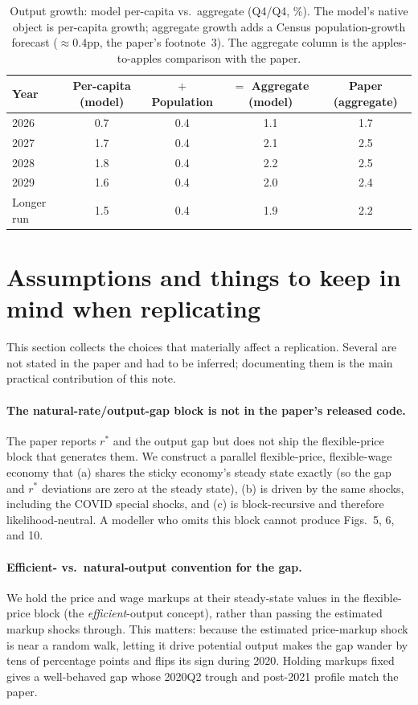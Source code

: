 \documentclass[11pt]{article}
\theoremstyle{definition}
\newcommand{\rstar}{r^{*}}
\begin{document}
\begin{table}[H]
\centering
\caption{Output growth: model per-capita vs.\ aggregate (Q4/Q4, \%). The model's native object is
per-capita growth; aggregate growth adds a Census population-growth forecast ($\approx 0.4$pp, the
paper's footnote~3). The aggregate column is the apples-to-apples comparison with the paper.}
\label{tab:growth-decomp}
\begin{tabular}{lcccc}
\toprule
Year & Per-capita (model) & $+$ Population & $=$ Aggregate (model) & Paper (aggregate) \\
\midrule
2026        & 0.7 & 0.4 & 1.1 & 1.7 \\
2027        & 1.7 & 0.4 & 2.1 & 2.5 \\
2028        & 1.8 & 0.4 & 2.2 & 2.5 \\
2029        & 1.6 & 0.4 & 2.0 & 2.4 \\
Longer run  & 1.5 & 0.4 & 1.9 & 2.2 \\
\bottomrule
\end{tabular}
\end{table}

\section{Assumptions and things to keep in mind when replicating}\label{sec:assumptions}
This section collects the choices that materially affect a replication. Several are not stated in the
paper and had to be inferred; documenting them is the main practical contribution of this note.

\paragraph{The natural-rate/output-gap block is not in the paper's released code.}
The paper reports $\rstar$ and the output gap but does not ship the flexible-price block that generates
them. We construct a parallel flexible-price, flexible-wage economy that (a) shares the sticky economy's
steady state exactly (so the gap and $\rstar$ deviations are zero at the steady state), (b) is driven by
the same shocks, including the COVID special shocks, and (c) is block-recursive and therefore
likelihood-neutral. A modeller who omits this block cannot produce Figs.\ 5, 6, and 10.

\paragraph{Efficient- vs.\ natural-output convention for the gap.}
We hold the price and wage markups at their steady-state values in the flexible-price block (the
\emph{efficient}-output concept), rather than passing the estimated markup shocks through. This matters:
because the estimated price-markup shock is near a random walk, letting it drive potential output makes
the gap wander by tens of percentage points and flips its sign during 2020. Holding markups fixed gives
a well-behaved gap whose 2020Q2 trough and post-2021 profile match the paper.
\end{document}
